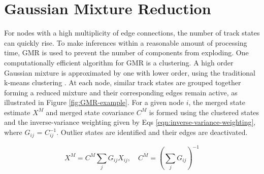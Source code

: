 




\section{Gaussian Mixture Reduction}
For nodes with a high multiplicity of edge connections, the number of track states can quickly rise. To make inferences within a reasonable amount of processing time, GMR is used to prevent the number of components from exploding. One computationally efficient algorithm for GMR is a clustering. A high order Gaussian mixture is approximated by one with lower order, using the traditional k-means clustering \cite{kmeans}. At each node, similar track states are grouped together forming a reduced mixture and their corresponding edges remain active, as illustrated in Figure \ref{fig:GMR-example}. For a given node $i$, the merged state estimate $X^{M}$ and merged state covariance $C^{M}$ is formed using the clustered states and the inverse-variance weighting \cite{inverse-variance-weighting} given by Eqs \eqref{eqn:inverse-variance-weighting}, where $G_{ij}$ = $C_{ij}^{-1}$. Outlier states are identified and their edges are deactivated.

\begin{equation}
    X^{M} = C^{M} \sum_{j} G_{ij} X_{ij},  \quad  C^{M} = \left( \sum_{j} G_{ij} \right) ^{-1}
    \label{eqn:inverse-variance-weighting}
\end{equation}


